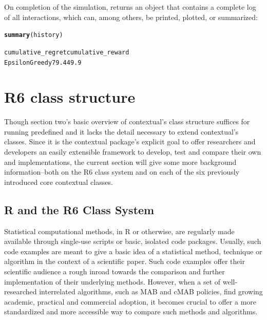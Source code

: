 \documentclass[nojss]{jss}\usepackage[]{graphicx}\usepackage[]{color}
\makeatletter
\newcommand{\hlkwd}[1]{\textcolor[rgb]{0.737,0.353,0.396}{\textbf{#1}}}%
\newenvironment{kframe}{%
 \def\at@end@of@kframe{}%
 \ifinner\ifhmode%
  \def\at@end@of@kframe{\end{minipage}}%
  \begin{minipage}{\columnwidth}%
 \fi\fi%
 \def\FrameCommand##1{\hskip\@totalleftmargin \hskip-\fboxsep
 \colorbox{shadecolor}{##1}\hskip-\fboxsep
     \hskip-\linewidth \hskip-\@totalleftmargin \hskip\columnwidth}%
 \MakeFramed {\advance\hsize-\width
   \@totalleftmargin\z@ \linewidth\hsize
   \@setminipage}}%
 {\par\unskip\endMakeFramed%
 \at@end@of@kframe}
\newenvironment{knitrout}{}{} %
\makeatother
\begin{document}
On completion of the simulation,  returns an  object that contains a complete log of all interactions, which can, among others, be printed, plotted, or summarized:

\begin{knitrout}\small
{}\color{fgcolor}\begin{kframe}
\begin{alltt}
\hlkwd{summary}(history)

                cumulative_regret cumulative_reward
EpsilonGreedy   79.44             9.9
\end{alltt}
\end{kframe}
\end{knitrout}



\section{R6 class structure}

Though section two's basic overview of contextual's  class structure suffices for running predefined  and  it lacks the detail necessary to extend contextual's classes. Since it is the contextual package's explicit goal to offer researchers and developers an easily extensible framework to develop, test and compare their own  and  implementations, the current section will give some more background information--both on the R6 class system and on each of the six previously introduced core contextual classes.

\subsection{R and the R6 Class System}

Statistical computational methods, in R or otherwise, are regularly made available through single-use scripts or basic, isolated code packages. Usually, such code examples are meant to give a basic idea of a statistical method, technique or algorithm in the context of a scientific paper.  Such code examples offer their scientific audience a rough inroad towards the comparison and further implementation of their underlying methods. However, when a set of well-researched interrelated algorithms, such as MAB and cMAB policies, find growing academic, practical and commercial adoption, it becomes crucial to offer a more standardized and more accessible way to compare such methods and algorithms.
\end{document}
